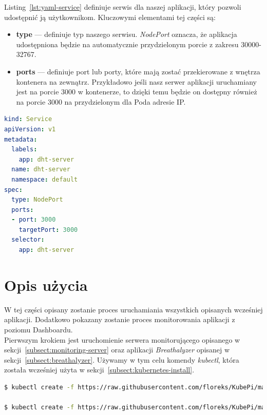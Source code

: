 \documentclass[12pt]{report}
\let\Oldsection\section
\renewcommand{\section}{\FloatBarrier\Oldsection}
\begin{document}
{\newpage
\noindent Listing~\ref{lst:yaml-service} definiuje serwis dla naszej aplikacji, który pozwoli udostępnić ją użytkownikom. Kluczowymi elementami tej części są:
\begin{itemize}
\item{\textbf{type} --- definiuje typ naszego serwisu. \textit{NodePort} oznacza, że aplikacja udo\-stępniona będzie na automatycznie przydzielonym porcie z zakresu 30000-32767. }
\item{\textbf{ports} --- definiuje port lub porty, które mają zostać przekierowane z wnętrza kontenera na zewnątrz. Przykładowo jeśli nasz serwer aplikacji uruchamiany jest na porcie 3000 w kontenerze, to dzięki temu będzie on dostępny również na porcie 3000 na przydzielonym dla Poda adresie IP.}
\end{itemize}
\begin{lstlisting}[language=yaml,caption=Definicja aplikacji uruchamianej w klastrze - część 3,label=lst:yaml-service]  
kind: Service
apiVersion: v1
metadata:
  labels:
    app: dht-server
  name: dht-server
  namespace: default
spec:
  type: NodePort
  ports:
  - port: 3000
    targetPort: 3000
  selector:
    app: dht-server
\end{lstlisting}

\section{Opis użycia}
W tej części opisany zostanie proces uruchamiania wszystkich opisanych wcześniej aplikacji. Dodatkowo pokazany zostanie proces monitorowania aplikacji z poziomu Dashboardu. \\

\noindent Pierwszym krokiem jest uruchomienie serwera monitorującego opisanego w sekcji~\ref{subsect:monitoring-server} oraz aplikacji \textit{Breathalyzer} opisanej w sekcji~\ref{subsect:breathalyzer}. Używamy w tym celu komendy \textit{kubectl}, która została wcześniej użyta w sekcji~\ref{subsect:kubernetes-install}.
\begin{lstlisting}[language=bash]
$ kubectl create -f https://raw.githubusercontent.com/floreks/KubePi/master/config/dht-server-arm.yaml

$ kubectl create -f https://raw.githubusercontent.com/floreks/KubePi/master/config/breathalyzer-arm.yaml
\end{lstlisting}

}
\end{document}

